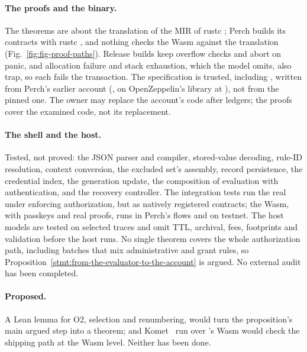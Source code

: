 \paragraph{The proofs and the binary.} The theorems are about the translation of
the MIR of rustc ; Perch builds its contracts with rustc
, and nothing checks the Wasm against the translation
(Fig.~\ref{fig:fig-proof-paths}). Release builds keep overflow checks and abort on
panic, and allocation failure and stack exhaustion, which the model omits, also
trap, so each fails the transaction. The specification is trusted, including
, written from Perch's earlier account (,
on OpenZeppelin's library at ), not from the pinned one. The
owner may replace the account's code after  ledgers;
the proofs cover the examined code, not its replacement.

\paragraph{The shell and the host.} Tested, not proved: the JSON parser and
compiler, stored-value decoding, rule-ID resolution, context conversion, the
excluded set's assembly, record persistence, the credential index, the
generation update, the composition of evaluation with authentication, and the
recovery controller. The integration tests run the real 
under enforcing authorization, but as natively registered contracts; the Wasm,
with passkeys and real proofs, runs in Perch's  flows
and on testnet. The host models are tested on selected traces and omit TTL,
archival, fees, footprints and validation before the host runs. No single
theorem covers the whole authorization path, including batches that mix
administrative and grant rules, so
Proposition~\ref{stmt:from-the-evaluator-to-the-account} is argued. No external
audit has been completed.

\paragraph{Proposed.} A Lean lemma for O2, selection and renumbering, would turn
the proposition's main argued step into a theorem; and Komet~\cite{komet} run
over 's Wasm would check the shipping path at the Wasm level.
Neither has been done.

